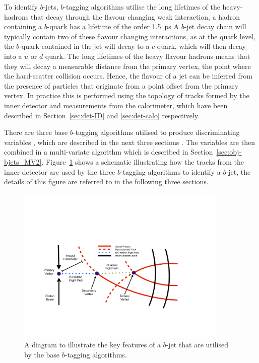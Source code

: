 To identify $b$-jets, $b$-tagging algorithms utilise the long lifetimes of the heavy-hadrons that decay through the flavour changing weak interaction,
a hadron containing a $b$-quark has a lifetime of the order \SI{1.5}{\pico\second} %
A $b$-jet decay chain  will typically contain two of these flavour changing interactions, 
as at the quark level, the $b$-quark contained in the jet will decay to a $c$-quark, which will then decay into a $u$ or $d$ quark.
The long lifetimes of the heavy flavour hadrons means that they will decay a measurable distance from the 
primary vertex, the point where the hard-scatter collision occurs.
Hence, the flavour of a jet can be inferred from the presence of particles
that originate from a point offset from the primary vertex.
In practice this is performed using the topology of tracks formed by the inner detector
and measurements from the calorimeter, which have been described in Section~\ref{sec:det-ID} and \ref{sec:det-calo} respectively.
   
There are three base $b$-tagging algorithms utilised to produce discriminating variables \cite{obj-bjets_algo_2016}, which are described in the next three sections .
The variables are then combined in a multi-variate algorithm which is described in Section~\ref{sec:obj-bjets_MV2}.
Figure~\ref{fig:obj_bjet_schem} shows a schematic illustrating how the tracks from the inner detector
are used by the three $b$-tagging algorithms to identify a $b$-jet, the details of this figure are referred to in the following three sections.

\begin{figure}[!htb]
  \begin{center}
    \includegraphics[width=0.9\textwidth]{figs/Objects/bjet_schem.pdf}
    \caption{A diagram to illustrate the key features of a $b$-jet that are utilised by the base $b$-tagging algorithms.}
    \label{fig:obj_bjet_schem}
  \end{center}
  \vspace{-0.5cm}
\end{figure}

